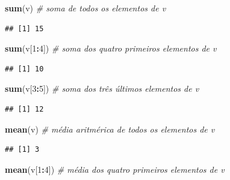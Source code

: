 \documentclass[
]{book}
\newenvironment{Shaded}{\begin{snugshade}}{\end{snugshade}}
\newcommand{\CommentTok}[1]{\textcolor[rgb]{0.56,0.35,0.01}{\textit{#1}}}
\newcommand{\DecValTok}[1]{\textcolor[rgb]{0.00,0.00,0.81}{#1}}
\newcommand{\KeywordTok}[1]{\textcolor[rgb]{0.13,0.29,0.53}{\textbf{#1}}}
\newcommand{\NormalTok}[1]{#1}
\newcommand{\OperatorTok}[1]{\textcolor[rgb]{0.81,0.36,0.00}{\textbf{#1}}}
\begin{document}
\begin{Shaded}
\begin{Highlighting}[]
\KeywordTok{sum}\NormalTok{(v) }\CommentTok{# soma de todos os elementos de v}
\end{Highlighting}
\end{Shaded}

\begin{verbatim}
## [1] 15
\end{verbatim}

\begin{Shaded}
\begin{Highlighting}[]
\KeywordTok{sum}\NormalTok{(v[}\DecValTok{1}\OperatorTok{:}\DecValTok{4}\NormalTok{]) }\CommentTok{# soma dos quatro primeiros elementos de v}
\end{Highlighting}
\end{Shaded}

\begin{verbatim}
## [1] 10
\end{verbatim}

\begin{Shaded}
\begin{Highlighting}[]
\KeywordTok{sum}\NormalTok{(v[}\DecValTok{3}\OperatorTok{:}\DecValTok{5}\NormalTok{]) }\CommentTok{# soma dos três últimos elementos de v}
\end{Highlighting}
\end{Shaded}

\begin{verbatim}
## [1] 12
\end{verbatim}

\begin{Shaded}
\begin{Highlighting}[]
\KeywordTok{mean}\NormalTok{(v) }\CommentTok{# média aritmérica de todos os elementos de v}
\end{Highlighting}
\end{Shaded}

\begin{verbatim}
## [1] 3
\end{verbatim}

\begin{Shaded}
\begin{Highlighting}[]
\KeywordTok{mean}\NormalTok{(v[}\DecValTok{1}\OperatorTok{:}\DecValTok{4}\NormalTok{]) }\CommentTok{# média dos quatro primeiros elementos de v}
\end{Highlighting}
\end{Shaded}
\end{document}
